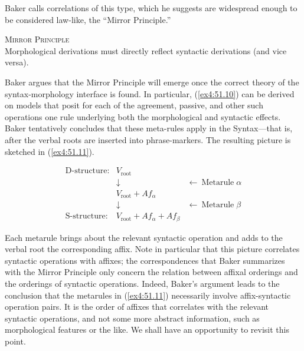 Baker calls correlations of this type, which he suggests are widespread enough to be considered law-like, the ``Mirror Principle.''
\begin{exe}
	\ex \label{ex4:51.10} \textsc{Mirror Principle}\\
				Morphological derivations must directly reflect syntactic derivations (and vice versa).\\
\hspace*{\fill} \citep[p.~375]{Baker:1985a} \hspace*{.5in}
\end{exe}
Baker argues that the Mirror Principle will emerge once the correct theory of the syntax-morphology interface is found. In particular, (\ref{ex4:51.10}) can be derived on models that posit for each of the agreement, passive, and other such operations one rule underlying both the morphological and syntactic effects. Baker tentatively concludes that these meta-rules apply in the Syntax---that is, after the verbal roots are inserted into phrase-markers. The resulting picture is sketched in (\ref{ex4:51.11}).
\begin{exe}
	\ex \label{ex4:51.11}
	\[ \begin{array}{lcr}
		\mbox{D-structure:} & V_{\text{root}} & \\
		& \downarrow & \leftarrow \: \text{Metarule} \; \alpha\\
		& V_{\text{root}}+Af_{\alpha} & \\
		& \downarrow & \leftarrow \: \text{Metarule} \; \beta\\
		\mbox{S-structure:} & V_{\text{root}}+Af_{\alpha}+Af_{\beta} &
		\end{array}
	\]
\end{exe}
Each metarule brings about the relevant syntactic operation and adds to the verbal root the corresponding affix. Note in particular that this picture correlates syntactic operations with affixes; the correspondences that Baker summarizes with the Mirror Principle only concern the relation between affixal orderings and the orderings of syntactic operations. Indeed, Baker's argument leads to the conclusion that the metarules in (\ref{ex4:51.11}) necessarily involve affix-syntactic operation pairs. It is the order of affixes that correlates with the relevant syntactic operations, and not some more abstract information, such as morphological features or the like. We shall have an opportunity to revisit this point.

